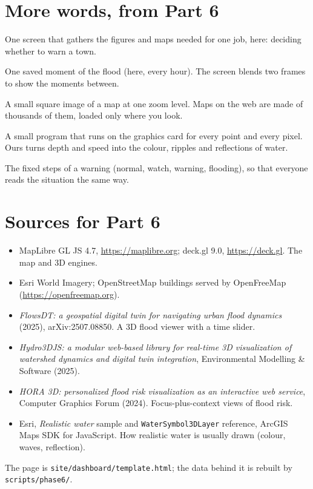 \section{More words, from Part 6}
\small
\begin{description}[leftmargin=3.2cm,style=nextline,itemsep=0.25em]
\item[Dashboard] One screen that gathers the figures and maps needed for one job, here: deciding whether to warn a town.
\item[Frame] One saved moment of the flood (here, every hour). The screen blends two frames to show the moments between.
\item[Map tile] A small square image of a map at one zoom level. Maps on the web are made of thousands of them, loaded only
where you look.
\item[Shader] A small program that runs on the graphics card for every point and every pixel. Ours turns depth and speed
into the colour, ripples and reflections of water.
\item[Status ladder] The fixed steps of a warning (normal, watch, warning, flooding), so that everyone reads the
situation the same way.
\end{description}
\normalsize

\section{Sources for Part 6}
\small
\begin{itemize}
\item MapLibre GL JS 4.7, \url{https://maplibre.org}; deck.gl 9.0, \url{https://deck.gl}. The map and 3D engines.
\item Esri World Imagery; OpenStreetMap buildings served by OpenFreeMap (\url{https://openfreemap.org}).
\item \emph{FlowsDT: a geospatial digital twin for navigating urban flood dynamics} (2025),
arXiv:2507.08850. A 3D flood viewer with a time slider.
\item \emph{Hydro3DJS: a modular web-based library for real-time 3D visualization of watershed dynamics and digital twin
integration}, Environmental Modelling \& Software (2025).
\item \emph{HORA 3D: personalized flood risk visualization as an interactive web service}, Computer Graphics Forum (2024).
Focus-plus-context views of flood risk.
\item Esri, \emph{Realistic water} sample and \texttt{WaterSymbol3DLayer} reference, ArcGIS Maps SDK for JavaScript. How
realistic water is usually drawn (colour, waves, reflection).
\end{itemize}
The page is \texttt{site/dashboard/template.html}; the data behind it is rebuilt by \texttt{scripts/phase6/}.
\normalsize
